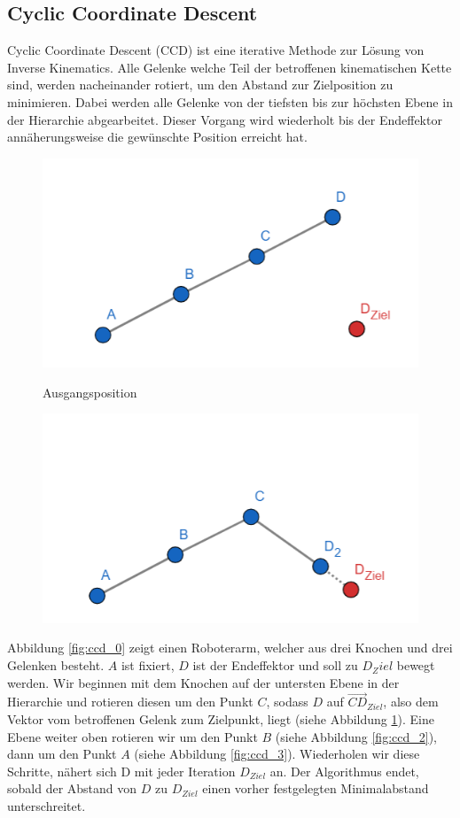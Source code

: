 \subsection{Cyclic Coordinate Descent}
Cyclic Coordinate Descent (CCD) ist eine iterative Methode zur Lösung von Inverse Kinematics. Alle Gelenke welche Teil der betroffenen kinematischen Kette sind, werden nacheinander rotiert, um den Abstand zur Zielposition zu minimieren. Dabei werden alle Gelenke von der tiefsten bis zur höchsten Ebene in der Hierarchie abgearbeitet. Dieser Vorgang wird wiederholt bis der Endeffektor annäherungsweise die gewünschte Position erreicht hat.
\newline\newline
\begin{figure}[!htb]
	\includegraphics[width=\linewidth]{img/ccd_0.png}
	\caption{Ausgangsposition}\label{fig:ccd_0}
	\endminipage\hfill
	\includegraphics[width=\linewidth]{img/ccd_1.png}
	\caption{}\label{fig:ccd_1}
	\endminipage\hfill
\end{figure} 
Abbildung \ref{fig:ccd_0} zeigt einen Roboterarm, welcher aus drei Knochen und drei Gelenken besteht. $A$ ist fixiert, $D$ ist der Endeffektor und soll zu $D_Ziel$ bewegt werden. Wir beginnen mit dem Knochen auf der untersten Ebene in der Hierarchie und rotieren diesen um den Punkt $C$, sodass $D$ auf $\vec{CD}_{Ziel}$, also dem Vektor vom betroffenen Gelenk zum Zielpunkt, liegt (siehe Abbildung \ref{fig:ccd_1}). Eine Ebene weiter oben rotieren wir um den Punkt $B$ (siehe Abbildung \ref{fig:ccd_2}), dann um den Punkt $A$ (siehe Abbildung \ref{fig:ccd_3}). Wiederholen wir diese Schritte, nähert sich D mit jeder Iteration $D_{Ziel}$ an. Der Algorithmus endet, sobald der Abstand von $D$ zu $D_{Ziel}$ einen vorher festgelegten Minimalabstand unterschreitet.
